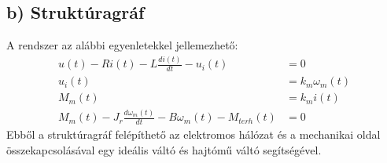 \newpage
\subsection{b) Struktúragráf}
A rendszer az alábbi egyenletekkel jellemezhető:
\begin{align}
    u(t) - R i(t) - L \frac{di(t)}{dt} - u_i(t)                        & = 0               \\
    u_i(t)                                                             & = k_m \omega_m(t) \\
    M_m(t)                                                             & = k_m i(t)        \\
    M_m(t) - J_r \frac{d\omega_m(t)}{dt} - B \omega_m(t) - M_{terh}(t) & = 0
\end{align}
Ebből a struktúragráf felépíthető az elektromos hálózat és a mechanikai oldal összekapcsolásával egy ideális váltó és hajtómű váltó segítségével.


